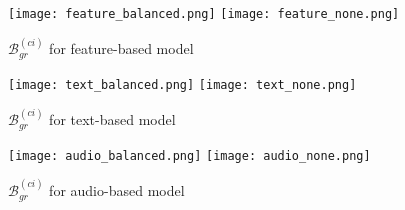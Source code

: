 \begin{figure}[H]
    \centering
    \begin{minipage}[t]{0.48\textwidth}
        \centering
        \texttt{[image: feature\_balanced.png]}
        \hfill
        \texttt{[image: feature\_none.png]}
        \caption{$\mathcal{B}^{(ci)}_{gr}$ for feature-based model}
        \label{fig:gradient_distance_feature}
    \end{minipage}
    \hfill
    \begin{minipage}[t]{0.48\textwidth}
        \centering
        \texttt{[image: text\_balanced.png]}
        \hfill
        \texttt{[image: text\_none.png]}
        \caption{$\mathcal{B}^{(ci)}_{gr}$ for text-based model}
        \label{fig:gradient_distance_text}
    \end{minipage}
    \hfill
    \begin{minipage}[t]{0.48\textwidth}
        \centering
        \texttt{[image: audio\_balanced.png]}
        \hfill
        \texttt{[image: audio\_none.png]}
        \caption{$\mathcal{B}^{(ci)}_{gr}$ for audio-based model}
        \label{fig:gradient_distance_audio}
    \end{minipage}
\end{figure}



